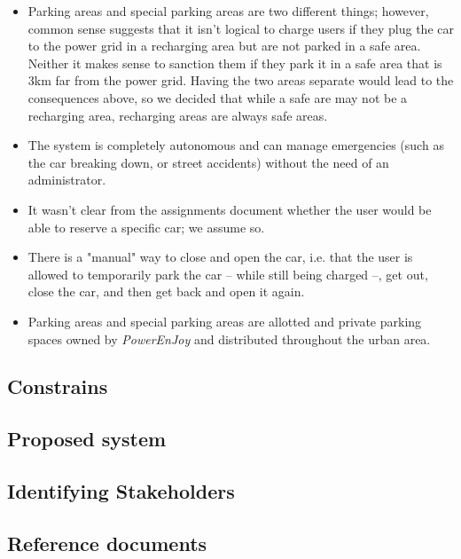 \documentclass{article}
\begin{document}
			\begin{itemize}
				\item Parking areas and special parking areas are two different things; however, common sense suggests that it isn't logical to charge users if they plug the car to the power grid in a recharging area but are not parked in a safe area. Neither it makes sense to sanction them if they park it in a safe area that is 3km far from the power grid. Having the two areas separate would lead to the consequences above, so we decided that while a safe are may not be a recharging area, recharging areas are always safe areas. 
				
				\item The system is completely autonomous and can manage emergencies (such as the car breaking down, or street accidents) without the need of an administrator. %
				
				\item It wasn't clear from the assignments document whether the user would be able to reserve a specific car; we assume so. %
				
				\item There is a "manual" way to close and open the car, i.e. that the user is allowed to temporarily park the car – while still being charged –, get out, close the car, and then get back and open it again.
				
				\item Parking areas and special parking areas are allotted and private parking spaces owned by \textit{PowerEnJoy} and distributed throughout the urban area. %
			\end{itemize}

		\subsection{Constrains}

		\subsection{Proposed system}

		\subsection{Identifying Stakeholders}

		\subsection{Reference documents}
\end{document}
